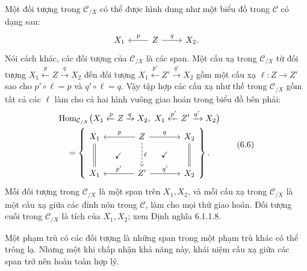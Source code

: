 Một đối tượng trong $\mathcal C_{/X}$ có thể được hình dung như một biểu đồ trong $\mathcal C$ có dạng sau:
\[\begin{tikzcd}X_1&Z\arrow[l,"p"']\arrow[r,"q"]&X_2.\end{tikzcd}\]
Nói cách khác, các đối tượng của $\mathcal C_{/X}$ là các span. Một cấu xạ trong $\mathcal C_{/X}$ từ đối tượng $X_1\xleftarrow pZ\xrightarrow qX_2$ đến đối tượng $X_1\xleftarrow{p'}Z'\xrightarrow{q'}X_2$ gồm một cấu xạ $\ell:Z\to Z'$ sao cho $p'\circ\ell=p$ và $q'\circ\ell=q$. Vậy tập hợp các cấu xạ như thế trong $\mathcal C_{/X}$ gồm tất cả các $\ell$ làm cho cả hai hình vuông
giao hoán trong biểu đồ bên phải:
\begin{equation*}\begin{gathered}
\operatorname{Hom}_{\mathcal C_{/X}}\bigl(X_1\xleftarrow pZ\xrightarrow qX_2,\ X_1\xleftarrow{p'}Z'\xrightarrow{q'}X_2\bigr)\\
=\left\{\begin{tikzcd}[ampersand replacement=\&,column sep=large,row sep=large]
X_1\arrow[d,equal]\arrow[dr,phantom,"\checkmark" description]\&Z\arrow[l,"p"']\arrow[r,"q"]\arrow[d,dashed,"\ell"]\arrow[dr,phantom,"\checkmark" description]\&X_2\arrow[d,equal]\\
X_1\&Z'\arrow[l,"p'"']\arrow[r,"q'"]\&X_2
\end{tikzcd}\right\}.
\end{gathered}\tag{6.6}\end{equation*}
Mỗi đối tượng trong $\mathcal C_{/X}$ là một span trên $X_1,X_2$, và mỗi cấu xạ trong $\mathcal C_{/X}$ là một cấu xạ giữa các đỉnh nón trong $\mathcal C$, làm cho mọi thứ giao hoán. Đối tượng cuối trong $\mathcal C_{/X}$ là tích của $X_1,X_2$; xem Định nghĩa 6.1.1.8.

Một phạm trù có các đối tượng là những span trong một phạm trù khác có thể trông lạ. Nhưng một khi chấp nhận khả năng này, khái niệm cấu xạ giữa các span trở nên hoàn toàn hợp lý.

